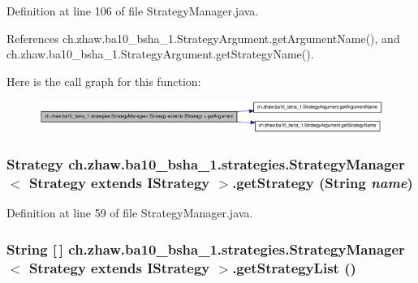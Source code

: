 Definition at line 106 of file StrategyManager.java.

References ch.zhaw.ba10\_\-bsha\_\-1.StrategyArgument.getArgumentName(), and ch.zhaw.ba10\_\-bsha\_\-1.StrategyArgument.getStrategyName().

Here is the call graph for this function:\nopagebreak
\begin{figure}[H]
\begin{center}
\leavevmode
\includegraphics[width=395pt]{classch_1_1zhaw_1_1ba10__bsha__1_1_1strategies_1_1StrategyManager_3_01Strategy_01extends_01IStrategy_01_4_adc2e565e79c96210a98da9a84f9d8fbe_cgraph}
\end{center}
\end{figure}
\hypertarget{classch_1_1zhaw_1_1ba10__bsha__1_1_1strategies_1_1StrategyManager_3_01Strategy_01extends_01IStrategy_01_4_a23f8ab3d6390dec06740ce73a3aab495}{
\subsubsection[{getStrategy}]{\setlength{\rightskip}{0pt plus 5cm}Strategy ch.zhaw.ba10\_\-bsha\_\-1.strategies.StrategyManager$<$ Strategy extends {\bf IStrategy} $>$.getStrategy (String {\em name})}}
\label{classch_1_1zhaw_1_1ba10__bsha__1_1_1strategies_1_1StrategyManager_3_01Strategy_01extends_01IStrategy_01_4_a23f8ab3d6390dec06740ce73a3aab495}


Definition at line 59 of file StrategyManager.java.\hypertarget{classch_1_1zhaw_1_1ba10__bsha__1_1_1strategies_1_1StrategyManager_3_01Strategy_01extends_01IStrategy_01_4_a8f7debe1707ac6bef066c4aa902f7428}{
\subsubsection[{getStrategyList}]{\setlength{\rightskip}{0pt plus 5cm}String \mbox{[}$\,$\mbox{]} ch.zhaw.ba10\_\-bsha\_\-1.strategies.StrategyManager$<$ Strategy extends {\bf IStrategy} $>$.getStrategyList ()}}
\label{classch_1_1zhaw_1_1ba10__bsha__1_1_1strategies_1_1StrategyManager_3_01Strategy_01extends_01IStrategy_01_4_a8f7debe1707ac6bef066c4aa902f7428}


